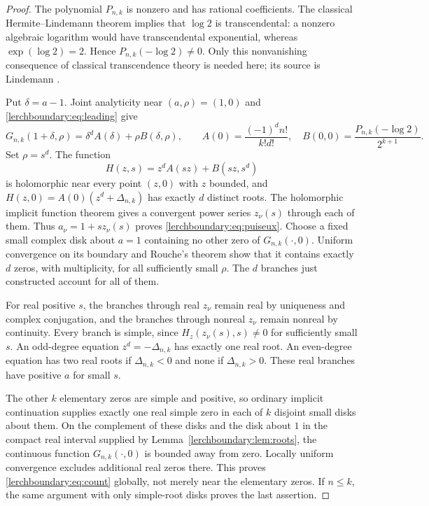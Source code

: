 \documentclass[11pt,a4paper]{article}
\theoremstyle{definition}
\theoremstyle{remark}
\numberwithin{equation}{section}
\begin{document}
\begin{proof}
The polynomial $P_{n,k}$ is nonzero and has rational coefficients.
The classical Hermite--Lindemann theorem implies that $\log2$ is
transcendental: a nonzero algebraic logarithm would have transcendental
exponential, whereas $\exp(\log2)=2$. Hence
$P_{n,k}(-\log2)\neq0$.  Only this nonvanishing consequence of classical
transcendence theory is needed here; its source is Lindemann \cite{Lindemann1882}.

Put $\delta=a-1$.  Joint analyticity near $(a,\rho)=(1,0)$ and
\eqref{lerchboundary:eq:leading} give
\begin{equation}\label{lerchboundary:eq:local}
 G_{n,k}(1+\delta,\rho)
   =\delta^d A(\delta)+\rho B(\delta,\rho),\qquad
 A(0)=\frac{(-1)^d n!}{k!d!},\quad
 B(0,0)=\frac{P_{n,k}(-\log2)}{2^{k+1}}.
\end{equation}
Set $\rho=s^d$. The function
\[
 H(z,s)=z^d A(sz)+B(sz,s^d)
\]
is holomorphic near every point $(z,0)$ with $z$ bounded, and
$H(z,0)=A(0)(z^d+\Delta_{n,k})$ has exactly $d$ distinct roots.
The holomorphic implicit function theorem gives a convergent power
series $z_\nu(s)$ through each of them. Thus
$a_\nu=1+s z_\nu(s)$ proves \eqref{lerchboundary:eq:puiseux}.
Choose a fixed small complex disk about $a=1$ containing no other
zero of $G_{n,k}(\cdot,0)$.  Uniform convergence on its boundary and
Rouche's theorem show that it contains exactly $d$ zeros, with
multiplicity, for all sufficiently small $\rho$.  The $d$ branches
just constructed account for all of them.

For real positive $s$, the branches through real $z_\nu$ remain real
by uniqueness and complex conjugation, and the branches through
nonreal $z_\nu$ remain nonreal by continuity. Every branch is simple,
since $H_z(z_\nu(s),s)\neq0$ for sufficiently small $s$.  An odd-degree
equation $z^d=-\Delta_{n,k}$ has exactly one real root. An even-degree
equation has two real roots if $\Delta_{n,k}<0$ and none if
$\Delta_{n,k}>0$.  These real branches have positive $a$ for small $s$.

The other $k$ elementary zeros are simple and positive, so ordinary
implicit continuation supplies exactly one real simple zero in each
of $k$ disjoint small disks about them.  On the complement of these
disks and the disk about $1$ in the compact real interval supplied
by Lemma~\ref{lerchboundary:lem:roots}, the continuous function
$G_{n,k}(\cdot,0)$ is bounded away from zero.  Locally uniform
convergence excludes additional real zeros there.  This proves
\eqref{lerchboundary:eq:count} globally, not merely near the elementary
zeros.  If $n\leq k$, the same argument with only simple-root disks
proves the last assertion.
\end{proof}
\end{document}
